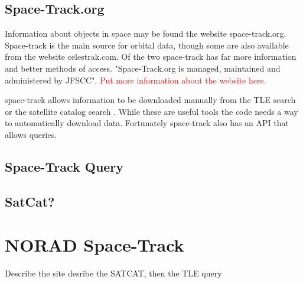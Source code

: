 \documentclass[12pt]{report}
\begin{document}
	\subsection{Space-Track.org}
	Information about objects in space may be found the website space-track.org. Space-track is the main source for orbital data, though some are also available from the website celestrak.com. Of the two space-track has far more information and better methods of access.  "Space-Track.org is managed, maintained and administered by JFSCC"\cite{SpaceTrackLegend}.   \textcolor{red}{Put more information about the website here}.\par 
	space-track allows information to be downloaded manually from the TLE search \cite{SpaceTrackTLE} or the satellite catalog search \cite{SpaceTrackSATCAT}. While these are useful tools the code needs a way to automatically download data. Fortunately space-track also has an API that allows queries. 
	\subsection{Space-Track Query}
	\subsection{SatCat?}
	\section{NORAD Space-Track}	
	Describe the site
	desribe the SATCAT, then the TLE query
	
	
	
	
\end{document}
